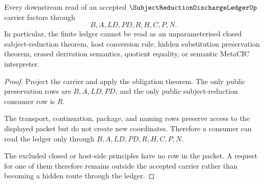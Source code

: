 \begin{theorem}
\label{thm:subject-reduction-discharge-ledger-nonescape}
Every downstream read of an accepted $\SubjectReductionDischargeLedgerUp$ carrier factors through
$$
B,A,LD,PD,R,H,C,P,N.
$$
In particular, the finite ledger cannot be read as an unparameterised closed subject-reduction theorem, host conversion rule, hidden substitution preservation theorem, erased derivation semantics, quotient equality, or semantic MetaCIC interpreter.
\end{theorem}
\begin{proof}
Project the carrier and apply the obligation theorem. The only public preservation rows are $B,A,LD,PD$, and the only public subject-reduction consumer row is $R$.

The transport, continuation, package, and naming rows preserve access to the displayed packet but do not create new coordinates. Therefore a consumer can read the ledger only through $B,A,LD,PD,R,H,C,P,N$.

The excluded closed or host-side principles have no row in the packet. A request for one of them therefore remains outside the accepted carrier rather than becoming a hidden route through the ledger.
\end{proof}

